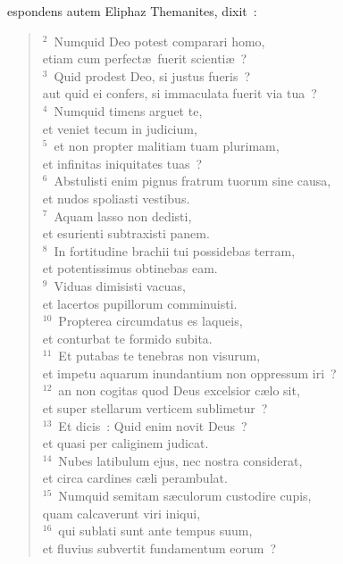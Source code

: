 \bchapter
{}espondens autem Eliphaz Themanites, dixit~:
\begin{flushleft}\begin{verse}\vspace{6pt}${}^{2}$~Numquid Deo potest comparari homo,\\ etiam cum perfect\ae\ fuerit scienti\ae~?\\
${}^{3}$~Quid prodest Deo, si justus fueris~?\\ aut quid ei confers, si immaculata fuerit via tua~?\\
${}^{4}$~Numquid timens arguet te,\\ et veniet tecum in judicium,\\
${}^{5}$~et non propter malitiam tuam plurimam,\\ et infinitas iniquitates tuas~?\\
${}^{6}$~Abstulisti enim pignus fratrum tuorum sine causa,\\ et nudos spoliasti vestibus.\\
${}^{7}$~Aquam lasso non dedisti,\\ et esurienti subtraxisti panem.\\
${}^{8}$~In fortitudine brachii tui possidebas terram,\\ et potentissimus obtinebas eam.\\
${}^{9}$~Viduas dimisisti vacuas,\\ et lacertos pupillorum comminuisti.\\
${}^{10}$~Propterea circumdatus es laqueis,\\ et conturbat te formido subita.\\
${}^{11}$~Et putabas te tenebras non visurum,\\ et impetu aquarum inundantium non oppressum iri~?\\
${}^{12}$~an non cogitas quod Deus excelsior c\ae lo sit,\\ et super stellarum verticem sublimetur~?\\
${}^{13}$~Et dicis~: Quid enim novit Deus~?\\ et quasi per caliginem judicat.\\
${}^{14}$~Nubes latibulum ejus, nec nostra considerat,\\ et circa cardines c\ae li perambulat.\\
${}^{15}$~Numquid semitam s\ae culorum custodire cupis,\\ quam calcaverunt viri iniqui,\\
${}^{16}$~qui sublati sunt ante tempus suum,\\ et fluvius subvertit fundamentum eorum~?\\

\end{verse}
\end{flushleft}
